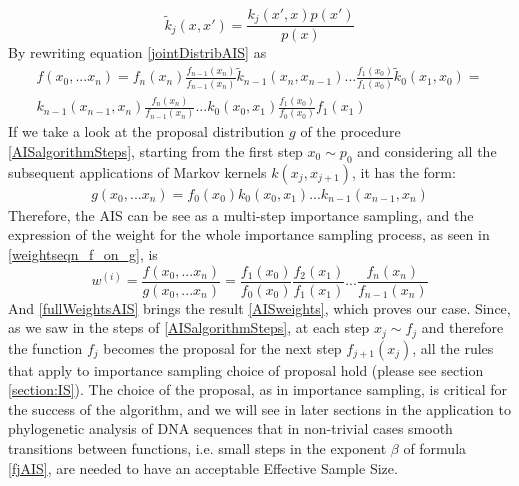 \documentclass[12pt,mythesisstyle]{report}
\begin{document}
\begin{equation}\label{detailedBalanceConditionAIS}
\tilde{k}_{j}(x,x')=\frac{k_{j}(x',x)p(x')}{p(x)}
\end{equation}
By rewriting equation \eqref{jointDistribAIS} as
\begin{equation}\label{jointDistribAISrewritten}
\begin{aligned}
f(x_0, ... x_n)=f_n(x_n)\frac{f_{n-1}(x_n)}{f_{n-1}(x_n)}\tilde{k}_{n-1}(x_n,x_{n-1})...\frac{f_{1}(x_0)}{f_{1}(x_0)}\tilde{k}_0(x_1,x_{0})=\\
k_{n-1}(x_{n-1},x_n)\frac{f_n(x_n)}{f_{n-1}(x_n)}...k_0(x_0,x_{1})\frac{f_{1}(x_0)}{f_{0}(x_0)}f_1(x_1)
\end{aligned}
\end{equation}
If we take a look at the proposal distribution $g$ of the procedure \eqref{AISalgorithmSteps}, starting from the first step $x_{0} \sim p_0$ and considering all the subsequent applications of Markov kernels $k(x_j,x_{j+1})$, it has the form:
\begin{equation}\label{jointproposalDistribAIS}
\begin{aligned}
g(x_0, ... x_n)=f_0(x_0)k_{0}(x_{0},x_1)...k_{n-1}(x_{n-1},x_{n})
\end{aligned}
\end{equation}
Therefore, the AIS can be see as a multi-step importance sampling, and the expression of the weight for the whole importance sampling process, as seen in \eqref{weightseqn_f_on_g}, is
\begin{equation}\label{fullWeightsAIS}
w^{(i)}=\frac{f(x_0, ... x_n)}{g(x_0, ... x_n)}=\frac{f_{1}(x_{0})}{f_{0}(x_{0})}\frac{f_{2}(x_{1})}{f_{1}(x_{1})}\text{...}\frac{f_{n}(x_{n})}{f_{n-1}(x_{n})}\end{equation}
And \eqref{fullWeightsAIS} brings the result \eqref{AISweights}, which proves our case.
Since, as we saw in the steps of \eqref{AISalgorithmSteps}, at each step $x_j \sim f_j$ and therefore the function $f_j$ becomes the proposal for the next step $f_{j+1}(x_j)$, all the rules that apply to importance sampling choice of proposal hold (please see section \ref{section:IS}). The choice of the proposal, as in importance sampling, is critical for the success of the algorithm, and we will see in later sections in the application to phylogenetic analysis of DNA sequences that in non-trivial cases smooth transitions between functions, i.e. small steps in the exponent $\beta$ of formula \eqref{fjAIS}, are needed to have an acceptable Effective Sample Size.
\end{document}
